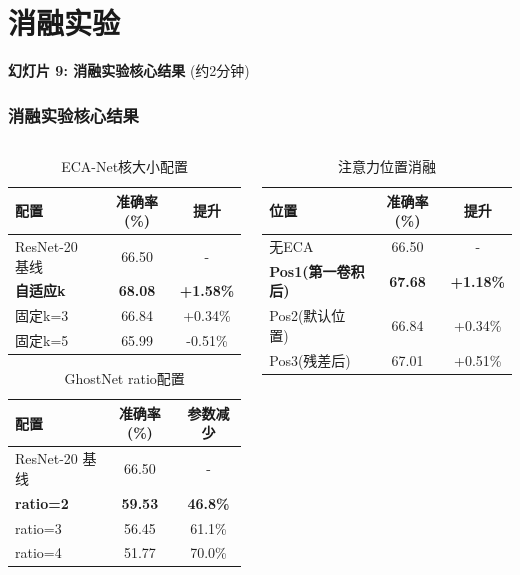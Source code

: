 \documentclass[10pt]{beamer}
\begin{document}
\section{消融实验}
\begin{frame}{\textbf{幻灯片 9: 消融实验核心结果} (约2分钟)}
\frametitle{消融实验核心结果}

\begin{columns}[T]
    \begin{column}{0.49\textwidth}
        \begin{table}[h]
        \centering
        {\scriptsize
        \begin{tabular}{|l|c|c|}
        \hline
        配置 & 准确率(\%) & 提升 \\
        \hline
        ResNet-20 基线 & 66.50 & - \\
        \textbf{自适应k} & \textbf{68.08} & \textbf{+1.58\%} \\
        固定k=3 & 66.84 & +0.34\% \\
        固定k=5 & 65.99 & -0.51\% \\
        \hline
        \end{tabular}
        \caption{ECA-Net核大小配置}}
        \end{table}
        
        \vspace{0.5em}
        \begin{table}[h]
        \centering
        {\scriptsize
        \begin{tabular}{|l|c|c|}
        \hline
        配置 & 准确率(\%) & 参数减少 \\
        \hline
        ResNet-20 基线 & 66.50 & - \\
        \textbf{ratio=2} & \textbf{59.53} & \textbf{46.8\%} \\
        ratio=3 & 56.45 & 61.1\% \\
        ratio=4 & 51.77 & 70.0\% \\
        \hline
        \end{tabular}
        \caption{GhostNet ratio配置}}
        \end{table}
    \end{column}
    \begin{column}{0.49\textwidth}
        \begin{table}[h]
        \centering
        {\scriptsize
        \begin{tabular}{|l|c|c|}
        \hline
        位置 & 准确率(\%) & 提升 \\
        \hline
        无ECA & 66.50 & - \\
        \textbf{Pos1(第一卷积后)} & \textbf{67.68} & \textbf{+1.18\%} \\
        Pos2(默认位置) & 66.84 & +0.34\% \\
        Pos3(残差后) & 67.01 & +0.51\% \\
        \hline
        \end{tabular}
        \caption{注意力位置消融}}
        \end{table}
        

\end{column}
\end{columns}
\end{frame}
\end{document}
